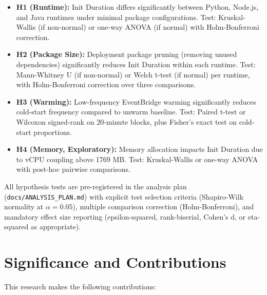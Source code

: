 \begin{itemize}
    \item \textbf{H1 (Runtime):} Init Duration differs significantly between Python, Node.js, and Java runtimes under minimal package configurations. Test: Kruskal-Wallis (if non-normal) or one-way ANOVA (if normal) with Holm-Bonferroni correction.
    
    \item \textbf{H2 (Package Size):} Deployment package pruning (removing unused dependencies) significantly reduces Init Duration within each runtime. Test: Mann-Whitney U (if non-normal) or Welch t-test (if normal) per runtime, with Holm-Bonferroni correction over three comparisons.
    
    \item \textbf{H3 (Warming):} Low-frequency EventBridge warming significantly reduces cold-start frequency compared to unwarm baseline. Test: Paired t-test or Wilcoxon signed-rank on 20-minute blocks, plus Fisher's exact test on cold-start proportions.
    
    \item \textbf{H4 (Memory, Exploratory):} Memory allocation impacts Init Duration due to vCPU coupling above 1769 MB. Test: Kruskal-Wallis or one-way ANOVA with post-hoc pairwise comparisons.
\end{itemize}

All hypothesis tests are pre-registered in the analysis plan (\texttt{docs/ANALYSIS\_PLAN.md}) with explicit test selection criteria (Shapiro-Wilk normality at $\alpha = 0.05$), multiple comparison correction (Holm-Bonferroni), and mandatory effect size reporting (epsilon-squared, rank-biserial, Cohen's d, or eta-squared as appropriate).

\section{Significance and Contributions}

This research makes the following contributions:

